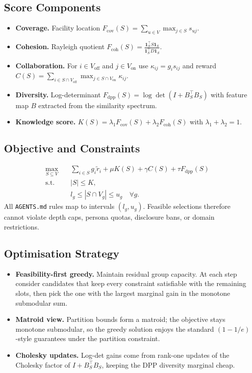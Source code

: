 \documentclass{article}
\begin{document}
\subsection{Score Components}
\begin{itemize}[leftmargin=*]
  \item \textbf{Coverage.} Facility location $F_{\mathrm{cov}}(S) = \sum_{u \in V} \max_{j \in S} s_{uj}$.
  \item \textbf{Cohesion.} Rayleigh quotient $F_{\mathrm{coh}}(S) = \frac{\mathbf{1}_S^\top S \mathbf{1}_S}{\mathbf{1}_S^\top D \mathbf{1}_S}$.
  \item \textbf{Collaboration.} For $i \in V_{\mathrm{off}}$ and $j \in V_{\mathrm{on}}$ use $\kappa_{ij} = g_i s_{ij}$ and reward $C(S) = \sum_{i \in S \cap V_{\mathrm{off}}} \max_{j \in S \cap V_{\mathrm{on}}} \kappa_{ij}$.
  \item \textbf{Diversity.} Log-determinant $F_{\mathrm{dpp}}(S) = \log\det(I + B_S^\top B_S)$ with feature map $B$ extracted from the similarity spectrum.
  \item \textbf{Knowledge score.} $K(S) = \lambda_1 F_{\mathrm{cov}}(S) + \lambda_2 F_{\mathrm{coh}}(S)$ with $\lambda_1 + \lambda_2 = 1$.
\end{itemize}

\subsection{Objective and Constraints}
\begin{align*}
  \max_{S \subseteq V} \quad & \sum_{i \in S} g_i \tilde r_i + \mu K(S) + \gamma C(S) + \tau F_{\mathrm{dpp}}(S) \\
  \text{s.t.} \quad & |S| \le K, \\
  & l_g \le |S \cap V_g| \le u_g \quad \forall g.
\end{align*}
All \texttt{AGENTS.md} rules map to intervals $(l_g, u_g)$. Feasible selections therefore cannot violate depth caps, persona quotas, disclosure bans, or domain restrictions.

\subsection{Optimisation Strategy}
\begin{itemize}[leftmargin=*]
  \item \textbf{Feasibility-first greedy.} Maintain residual group capacity. At each step consider candidates that keep every constraint satisfiable with the remaining slots, then pick the one with the largest marginal gain in the monotone submodular sum.
  \item \textbf{Matroid view.} Partition bounds form a matroid; the objective stays monotone submodular, so the greedy solution enjoys the standard $(1-1/e)$-style guarantees under the partition constraint.
  \item \textbf{Cholesky updates.} Log-det gains come from rank-one updates of the Cholesky factor of $I + B_S^\top B_S$, keeping the DPP diversity marginal cheap.
\end{itemize}
\end{document}
